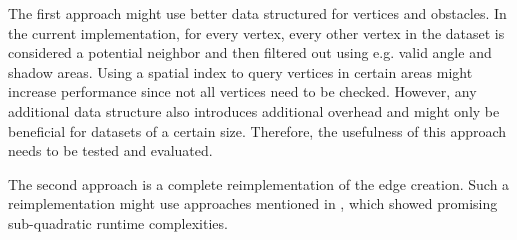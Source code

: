 		The first approach might use better data structured for vertices and obstacles.
		In the current implementation, for every vertex, every other vertex in the dataset is considered a potential neighbor and then filtered out using e.g. valid angle and shadow areas.
		Using a spatial index to query vertices in certain areas might increase performance since not all vertices need to be checked.
		However, any additional data structure also introduces additional overhead and might only be beneficial for datasets of a certain size.
		Therefore, the usefulness of this approach needs to be tested and evaluated.
		
		The second approach is a complete reimplementation of the edge creation.
		Such a reimplementation might use approaches mentioned in , which showed promising sub-quadratic runtime complexities.
		
